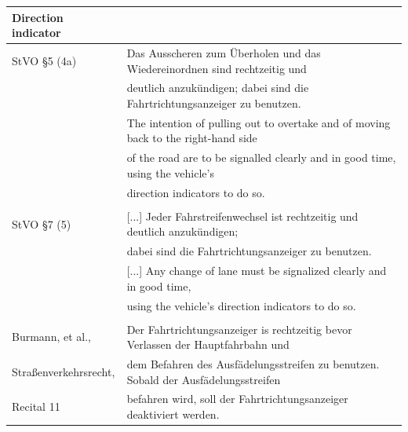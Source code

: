 \begin{table}[H]
	\centering
	\begin{tabular}[t]{ll}
		\toprule
		\textbf{Direction indicator}&\\ 
		\midrule
		StVO \S 5 (4a) & Das Ausscheren zum Überholen und das Wiedereinordnen sind rechtzeitig und \\
		& deutlich  anzukündigen; dabei sind die Fahrtrichtungsanzeiger zu benutzen. \\
		& The intention of pulling out to overtake and of moving back to the right-hand side \\
		& of the road are to be signalled clearly and in good time, using the vehicle’s \\
		& direction indicators to do so.\\
		&\\
		StVO \S 7 (5) & [...] Jeder Fahrstreifenwechsel ist rechtzeitig und deutlich anzukündigen; \\
		& dabei sind die Fahrtrichtungsanzeiger zu benutzen. \\
		& [...] Any change of lane must be signalized clearly and in good time, \\
		& using the vehicle’s direction indicators to do so. \\
		&\\
		Burmann, et al., &  Der Fahrtrichtungsanzeiger is rechtzeitig bevor Verlassen der Hauptfahrbahn und\\
		Straßenverkehrsrecht,&  dem Befahren des Ausfädelungsstreifen zu benutzen. Sobald der Ausfädelungsstreifen\\
		Recital 11  &  befahren wird, soll der Fahrtrichtungsanzeiger deaktiviert werden. \\
		

\end{tabular}
\end{table}
